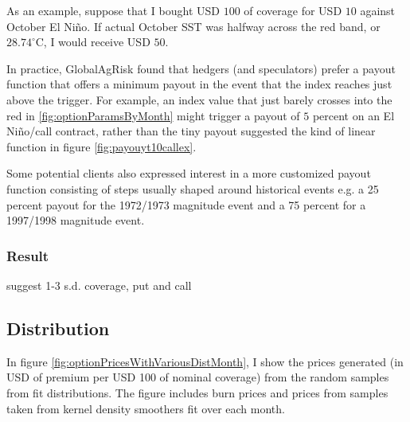 \documentclass[authoryear]{article}
\begin{document}
As an example, suppose that I bought USD $100$ of coverage for USD $10$ against October El Ni\~no. If actual October SST was halfway across the red band, or $28.74^{\circ}\mathrm{C}$, I would receive USD $50$.

In practice, GlobalAgRisk found that hedgers (and speculators) prefer a payout function that offers a minimum payout in the event that the index reaches just above the trigger. For example, an index value that just barely crosses into the red in \ref{fig:optionParamsByMonth} might trigger a payout of $5$ percent on an El Ni\~no/call contract, rather than the tiny payout suggested the kind of linear function in figure \ref{fig:payouyt10callex}.

Some potential clients also expressed interest in a more customized payout function consisting of steps usually shaped around historical events e.g. a 25 percent payout for the 1972/1973 magnitude event and a 75 percent for a 1997/1998 magnitude event.
\subsubsection{Result}
suggest 1-3 s.d. coverage, put and call

\subsection{Distribution}

In figure \ref{fig:optionPricesWithVariousDistMonth}, I show the prices generated (in USD of premium per USD 100 of nominal coverage) from the random samples from fit distributions. The figure includes burn prices and prices from samples taken from kernel density smoothers fit over each month. 
\end{document}
